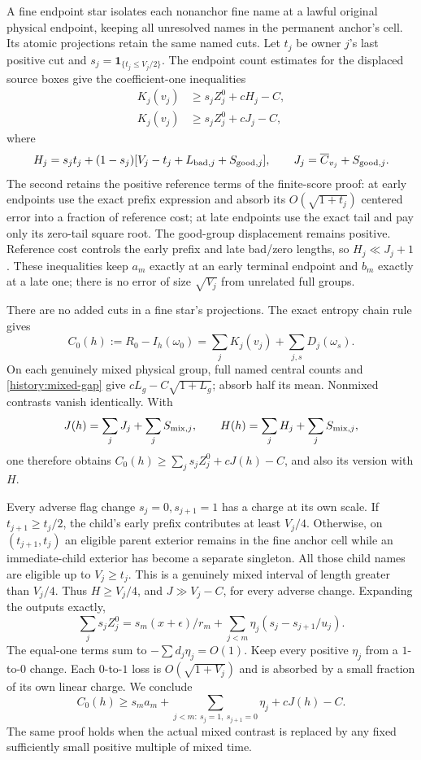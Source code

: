 A fine endpoint star isolates each nonanchor fine name at a lawful
original physical endpoint, keeping all unresolved names in the permanent
anchor's cell. Its atomic projections retain the same named cuts.
Let $t_j$ be owner $j$'s last positive cut and
$s_j=\mathbf1_{\{t_j\le V_j/2\}}$. The endpoint count estimates
for the displaced source boxes give the coefficient-one inequalities
\begin{align}
 K_j(v_j)&\ge s_jZ_j^0+cH_j-C,
 \label{history:local-endpoint-H}\\
 K_j(v_j)&\ge s_jZ_j^0+cJ_j-C,
 \label{history:local-endpoint-J}
\end{align}
where
\[
 H_j=s_jt_j+(1-s_j)[V_j-t_j+L_{{\rm bad},j}+S_{{\rm good},j}],
 \qquad J_j=\overline C_{v_j}+S_{{\rm good},j}.
\]
The second retains the positive reference terms of the finite-score
proof: at early endpoints use the exact prefix expression and absorb
its $O(\sqrt{1+t_j})$ centered error into a fraction of reference cost;
at late endpoints use the exact tail and pay only its zero-tail square
root. The good-group displacement remains positive. Reference cost
controls the early prefix and late bad/zero lengths, so $H_j\ll J_j+1$.
These inequalities keep $a_m$ exactly at an early terminal endpoint and
$b_m$ exactly at a late one; there is no error of size $\sqrt{V_j}$
from unrelated full groups.

There are no added cuts in a fine star's projections. The exact entropy
chain rule gives
\[
 C_0(h):=R_0-I_h(\omega_0)=\sum_jK_j(v_j)+\sum_{j,s}D_j(\omega_s).
\]
On each genuinely mixed physical group, full named central counts and
\eqref{history:mixed-gap} give $cL_g-C\sqrt{1+L_g}$; absorb half
its mean. Nonmixed contrasts vanish identically. With
\[
 J(h)=\sum_jJ_j+\sum_jS_{{\rm mix},j},\qquad
 H(h)=\sum_jH_j+\sum_jS_{{\rm mix},j},
\]
one therefore obtains $C_0(h)\ge\sum_js_jZ_j^0+cJ(h)-C$, and
also its version with $H$.

Every adverse flag change $s_j=0,s_{j+1}=1$ has a charge at its own
scale. If $t_{j+1}\ge t_j/2$, the child's early prefix contributes
at least $V_j/4$. Otherwise, on $(t_{j+1},t_j)$ an eligible parent
exterior remains in the fine anchor cell while an immediate-child
exterior has become a separate singleton. All those child names are
eligible up to $V_j\ge t_j$. This is a genuinely mixed interval of
length greater than $V_j/4$. Thus $H\ge V_j/4$, and $J\gg V_j-C$,
for every adverse change. Expanding the outputs exactly,
\[
 \sum_js_jZ_j^0=s_m(x+\epsilon)/r_m
             +\sum_{j<m}\eta_j(s_j-s_{j+1}/u_j).
\]
The equal-one terms sum to $-\sum d_j\eta_j=O(1)$. Keep every
positive $\eta_j$ from a $1$-to-$0$ change. Each $0$-to-$1$ loss
is $O(\sqrt{1+V_j})$ and is absorbed by a small fraction of its
own linear charge. We conclude
\begin{equation}
 C_0(h)\ge s_ma_m+
    \sum_{j<m:\ s_j=1,\ s_{j+1}=0}\eta_j+cJ(h)-C.
 \label{history:enhanced-endpoint}
\end{equation}
The same proof holds when the actual mixed contrast is replaced by
any fixed sufficiently small positive multiple of mixed time.

